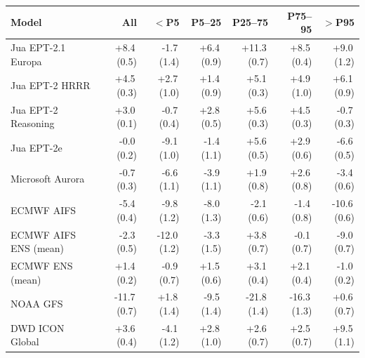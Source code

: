 \begin{tabular}{@{}lrrrrrr@{}}
\toprule
Model & All & $<$P5 & P5--25 & P25--75 & P75--95 & $>$P95 \\
\midrule
Jua EPT-2.1 Europa & +8.4\,(0.5) & -1.7\,(1.4) & +6.4\,(0.9) & +11.3\,(0.7) & +8.5\,(0.4) & +9.0\,(1.2) \\\addlinespace[0.35em]
Jua EPT-2 HRRR & +4.5\,(0.3) & +2.7\,(1.0) & +1.4\,(0.9) & +5.1\,(0.3) & +4.9\,(1.0) & +6.1\,(0.9) \\\addlinespace[0.35em]
Jua EPT-2 Reasoning & +3.0\,(0.1) & -0.7\,(0.4) & +2.8\,(0.5) & +5.6\,(0.3) & +4.5\,(0.3) & -0.7\,(0.3) \\\addlinespace[0.35em]
Jua EPT-2e & -0.0\,(0.2) & -9.1\,(1.0) & -1.4\,(1.1) & +5.6\,(0.5) & +2.9\,(0.6) & -6.6\,(0.5) \\\addlinespace[0.35em]
Microsoft Aurora & -0.7\,(0.3) & -6.6\,(1.1) & -3.9\,(1.1) & +1.9\,(0.8) & +2.6\,(0.8) & -3.4\,(0.6) \\\addlinespace[0.35em]
ECMWF AIFS & -5.4\,(0.4) & -9.8\,(1.2) & -8.0\,(1.3) & -2.1\,(0.6) & -1.4\,(0.8) & -10.6\,(0.6) \\\addlinespace[0.35em]
ECMWF AIFS ENS (mean) & -2.3\,(0.5) & -12.0\,(1.2) & -3.3\,(1.5) & +3.8\,(0.7) & -0.1\,(0.7) & -9.0\,(0.7) \\\addlinespace[0.35em]
ECMWF ENS (mean) & +1.4\,(0.2) & -0.9\,(0.7) & +1.5\,(0.6) & +3.1\,(0.4) & +2.1\,(0.4) & -1.0\,(0.2) \\\addlinespace[0.35em]
NOAA GFS & -11.7\,(0.7) & +1.8\,(1.4) & -9.5\,(1.4) & -21.8\,(1.4) & -16.3\,(1.3) & +0.6\,(0.7) \\\addlinespace[0.35em]
DWD ICON Global & +3.6\,(0.4) & -4.1\,(1.2) & +2.8\,(1.0) & +2.6\,(0.7) & +2.5\,(0.7) & +9.5\,(1.1) \\
\bottomrule
\end{tabular}
